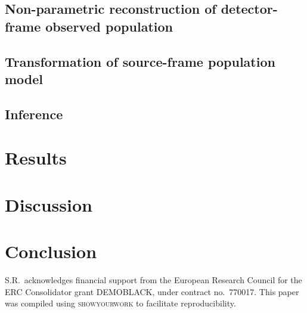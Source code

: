 \documentclass[aps,prd,twocolumn,superscriptaddress,preprintnumbers,nofootinbib,hidelinks]{revtex4-2}
\begin{document}
\subsection{Non-parametric reconstruction of detector-frame observed population}
\label{sec:reconstruction}

\subsection{Transformation of source-frame population model}
\label{sec:transformation}

\subsection{Inference}
\label{sec:inference}

\section{Results}
\label{sec:results}

\subsection{}

\section{Discussion}
\label{sec:discussion}

\section{Conclusion}
\label{sec:conclusion}

\begin{acknowledgments}

S.R.~acknowledges financial support from the European Research Council for the ERC Consolidator grant DEMOBLACK, under contract no.~770017.
This paper was compiled using \textsc{showyourwork} \cite{Luger2021} to facilitate reproducibility.

\end{acknowledgments}


\end{document}
